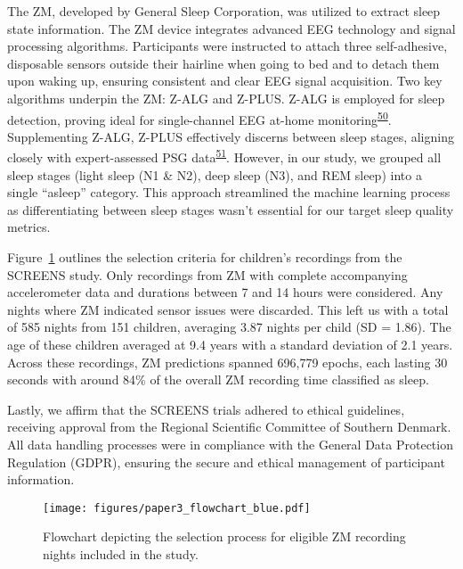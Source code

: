 \documentclass[
  10pt,
]{scrbook}
\begin{document}
The ZM, developed by General Sleep Corporation, was utilized to extract
sleep state information. The ZM device integrates advanced EEG
technology and signal processing algorithms. Participants were
instructed to attach three self-adhesive, disposable sensors outside
their hairline when going to bed and to detach them upon waking up,
ensuring consistent and clear EEG signal acquisition. Two key algorithms
underpin the ZM: Z-ALG and Z-PLUS. Z-ALG is employed for sleep
detection, proving ideal for single-channel EEG at-home
monitoring\textsuperscript{\protect\hyperlink{ref-kaplan_performance_2014}{50}}.
Supplementing Z-ALG, Z-PLUS effectively discerns between sleep stages,
aligning closely with expert-assessed PSG
data\textsuperscript{\protect\hyperlink{ref-wang_evaluation_2015}{51}}.
However, in our study, we grouped all sleep stages (light sleep (N1 \&
N2), deep sleep (N3), and REM sleep) into a single ``asleep'' category.
This approach streamlined the machine learning process as
differentiating between sleep stages wasn't essential for our target
sleep quality metrics.

Figure~\ref{fig-paper3_flow} outlines the selection criteria for
children's recordings from the SCREENS study. Only recordings from ZM
with complete accompanying accelerometer data and durations between 7
and 14 hours were considered. Any nights where ZM indicated sensor
issues were discarded. This left us with a total of 585 nights from 151
children, averaging 3.87 nights per child (SD = 1.86). The age of these
children averaged at 9.4 years with a standard deviation of 2.1 years.
Across these recordings, ZM predictions spanned 696,779 epochs, each
lasting 30 seconds with around 84\% of the overall ZM recording time
classified as sleep.

Lastly, we affirm that the SCREENS trials adhered to ethical guidelines,
receiving approval from the Regional Scientific Committee of Southern
Denmark. All data handling processes were in compliance with the General
Data Protection Regulation (GDPR), ensuring the secure and ethical
management of participant information.

\begin{figure}

{\centering \texttt{[image: figures/paper3\_flowchart\_blue.pdf]}

}

\caption{\label{fig-paper3_flow}Flowchart depicting the selection
process for eligible ZM recording nights included in the study.}

\end{figure}
\end{document}

